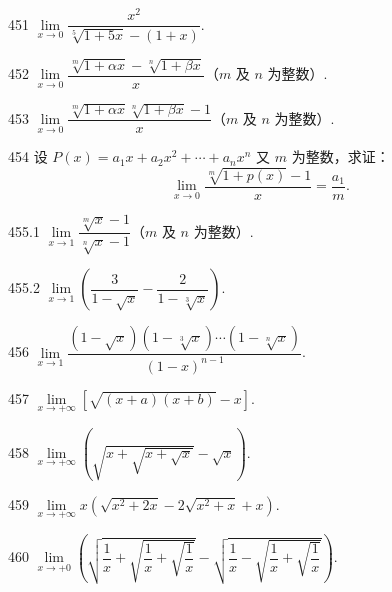 \begin{prob}[S]{451}
$\lim\limits_{x \to 0} \dfrac{x^2}{\sqrt[5]{1 + 5x} - (1 + x)}$.
\end{prob}

\begin{prob}[S]{452}
$\lim\limits_{x \to 0} \dfrac{\sqrt[m]{1 + \alpha x} - \sqrt[n]{1 + \beta x}}{x}$（$m$ 及 $n$ 为整数）.
\end{prob}

\begin{prob}[S]{453}
$\lim\limits_{x \to 0} \dfrac{\sqrt[m]{1 + \alpha x}\sqrt[n]{1 + \beta x} - 1}{x}$（$m$ 及 $n$ 为整数）.
\end{prob}

\begin{prob}[M]{454}
设 $P(x) = a_1 x + a_2 x^2 + \cdots + a_n x^n$ 又 $m$ 为整数，求证：
\[
\lim_{x \to 0} \frac{\sqrt[m]{1 + p(x)} - 1}{x} = \frac{a_1}{m}.
\]
\end{prob}


\begin{prob}[S]{455.1}
$\lim\limits_{x \to 1} \dfrac{\sqrt[m]{x} - 1}{\sqrt[n]{x} - 1}$（$m$ 及 $n$ 为整数）.
\end{prob}

\begin{prob}[S]{455.2}
$\lim\limits_{x \to 1} \left(\dfrac{3}{1 - \sqrt{x}} - \dfrac{2}{1 - \sqrt[3]{x}}\right)$.
\end{prob}

\begin{prob}[S]{456}
$\lim\limits_{x \to 1} \dfrac{(1 - \sqrt{x})(1 - \sqrt[3]{x})\cdots(1 - \sqrt[n]{x})}{(1 - x)^{n-1}}$.
\end{prob}

\begin{prob}[S]{457}
$\lim\limits_{x \to +\infty} \left[\sqrt{(x + a)(x + b)} - x\right]$.
\end{prob}

\begin{prob}[S]{458}
$\lim\limits_{x \to +\infty} \left(\sqrt{x + \sqrt{x + \sqrt{x}}} - \sqrt{x}\right)$.
\end{prob}

\begin{prob}[S]{459}
$\lim\limits_{x \to +\infty} x\left(\sqrt{x^2 + 2x} - 2\sqrt{x^2 + x} + x\right)$.
\end{prob}

\begin{prob}[M]{460}
$\lim\limits_{x \to +0} \left(\sqrt{\dfrac{1}{x} + \sqrt{\dfrac{1}{x} + \sqrt{\dfrac{1}{x}}}} - \sqrt{\dfrac{1}{x} - \sqrt{\dfrac{1}{x} + \sqrt{\dfrac{1}{x}}}}\right)$.
\end{prob}

